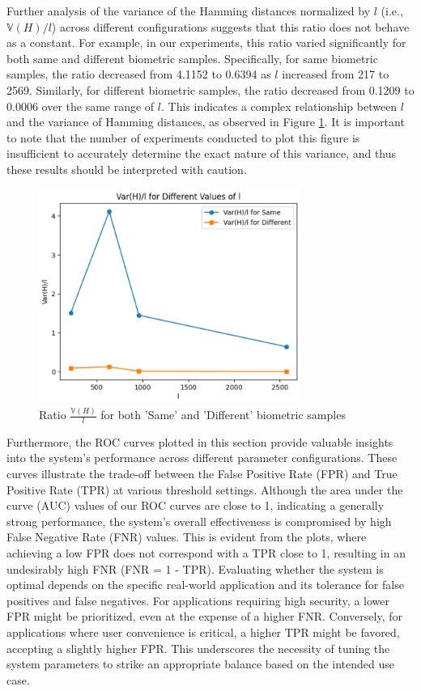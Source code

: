 Further analysis of the variance of the Hamming distances normalized by \( l \) (i.e., \(\mathbb{V}(H) / l\)) across different configurations suggests that this ratio does not behave as a constant. For example, in our experiments, this ratio varied significantly for both same and different biometric samples. Specifically, for same biometric samples, the ratio decreased from 4.1152 to 0.6394 as \( l \) increased from 217 to 2569. Similarly, for different biometric samples, the ratio decreased from 0.1209 to 0.0006 over the same range of \( l \). This indicates a complex relationship between \( l \) and the variance of Hamming distances, as observed in Figure \ref{variance_iterations}. It is important to note that the number of experiments conducted to plot this figure is insufficient to accurately determine the exact nature of this variance, and thus these results should be interpreted with caution.

\begin{figure}[H]
    \centering
    \includegraphics[width=\linewidth,height=7cm,keepaspectratio]{latex-img/variance_iterations.png}
    \caption{Ratio \(\frac{\mathbb{V}(H)}{l}\) for both 'Same' and 'Different' biometric samples}
    \label{variance_iterations}
\end{figure}

Furthermore, the ROC curves plotted in this section provide valuable insights into the system's performance across different parameter configurations. These curves illustrate the trade-off between the False Positive Rate (FPR) and True Positive Rate (TPR) at various threshold settings. Although the area under the curve (AUC) values of our ROC curves are close to 1, indicating a generally strong performance, the system's overall effectiveness is compromised by high False Negative Rate (FNR) values. This is evident from the plots, where achieving a low FPR does not correspond with a TPR close to 1, resulting in an undesirably high FNR (FNR = 1 - TPR). Evaluating whether the system is optimal depends on the specific real-world application and its tolerance for false positives and false negatives. For applications requiring high security, a lower FPR might be prioritized, even at the expense of a higher FNR. Conversely, for applications where user convenience is critical, a higher TPR might be favored, accepting a slightly higher FPR. This underscores the necessity of tuning the system parameters to strike an appropriate balance based on the intended use case.

